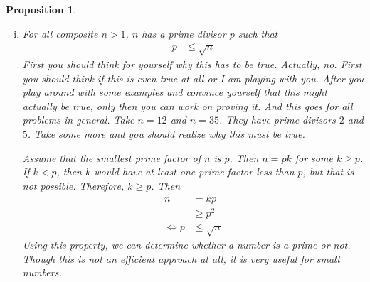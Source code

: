 \documentclass[a4paper, 12pt, leqno]{article}
\newtheorem{proposition}{Proposition}
\theoremstyle{definition}
\theoremstyle{remark}
\begin{document}
\begin{proposition}
\begin{enumerate}[i.]
					What the proposition says is that, for positive integer $a,b$ there are unique integer $q$ and a unique positive integer $r$ such that $b=aq+r$ and $0\leq r<a$. We can prove this easily as well. And the uniqueness of $r$ can prove the uniqueness of $q$ as well (and vice versa). For the sake of contradiction, suppose that,
						\begin{align*}
							b = aq_1+r_1 & = aq_2+r_2
						\end{align*}
					where both $0\leq r_1,r_2<a$. From the latter, we get
						\begin{align*}
							a(q_1-q_2) & = r_2-r_1
						\end{align*}
					This equation says that $a$ divides $r_2-r_1$. Unless $|r_2-r_1|=0$, this can not be true (why?). The conclusion follows.
					\item For all composite $n > 1$, $n$ has a prime divisor $p$ such that
						\begin{align*}
							p & \leq \sqrt{n}
						\end{align*}
					First you should think for yourself why this has to be true. Actually, no. First you should think if this is even true at all or I am playing with you. After you play around with some examples and convince yourself that this might actually be true, only then you can work on proving it. And this goes for all problems in general. Take $n=12$ and $n=35$. They have prime divisors $2$ and $5$. Take some more and you should realize why this must be true.
					
					Assume that the smallest prime factor of $n$ is $p$. Then $n = pk$ for some
					$k\geq p$. If $k < p$, then $k$ would have at least one prime factor less than
					$p$, but that is not possible. Therefore, $k \geq p$. Then
						\begin{align*}
							n & = kp\\
							  & \geq p^2\\
							\iff p& \leq \sqrt{n}
						\end{align*}
					Using this property, we can determine whether a number is a prime or
					not. Though this is not an efficient approach at all, it is very useful for
					small numbers.
				\end{enumerate}
		\end{proposition}
	
\end{document}
